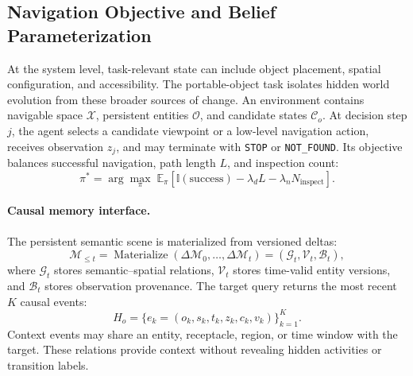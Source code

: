 \subsection{Navigation Objective and Belief Parameterization}
\label{app:belief-parameterization}

At the system level, task-relevant state can include object placement, spatial
configuration, and accessibility. The portable-object task isolates hidden world
evolution from these broader sources of change. An environment contains
navigable space $\mathcal X$, persistent entities $\mathcal O$, and candidate
states $\mathcal C_o$. At decision step $j$, the agent selects a candidate
viewpoint or a low-level navigation action, receives observation $z_j$, and may
terminate with \texttt{STOP} or \texttt{NOT\_FOUND}. Its objective balances
successful navigation, path length $L$, and inspection count:
\begin{equation}
\pi^*=\arg\max_{\pi}\;\mathbb E_{\pi}\!\left[
\mathbb I(\mathrm{success})-\lambda_d L-\lambda_n N_{\mathrm{inspect}}
\right].
\label{eq:objective}
\end{equation}

\paragraph{Causal memory interface.}
The persistent semantic scene is materialized from versioned deltas:
\begin{equation}
\mathcal M_{\leq t}=\operatorname{Materialize}(\Delta\mathcal M_0,\ldots,\Delta\mathcal M_t)
=(\mathcal G_t,\mathcal V_t,\mathcal B_t),
\label{eq:memory}
\end{equation}
where $\mathcal G_t$ stores semantic--spatial relations, $\mathcal V_t$ stores
time-valid entity versions, and $\mathcal B_t$ stores observation provenance.
The target query returns the most recent $K$ causal events:
\begin{equation}
H_o=\{e_k=(o_k,s_k,t_k,z_k,c_k,v_k)\}_{k=1}^{K}.
\label{eq:history}
\end{equation}
Context events may share an entity, receptacle, region, or time window with the
target. These relations provide context without revealing hidden activities or
transition labels.

